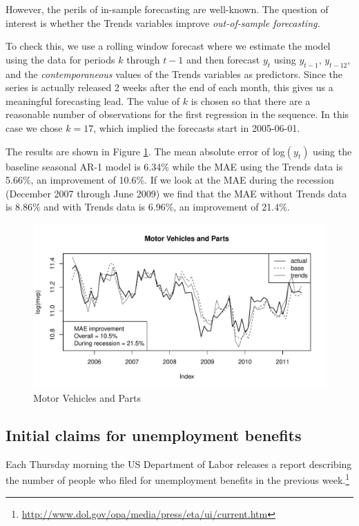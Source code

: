 \documentclass[12pt, oneside]{article}
\begin{document}
However, the perils of in-sample forecasting are well-known.  The
question of interest is whether the Trends variables improve
{\it out-of-sample forecasting.}

To check this, we use a rolling window forecast where we estimate the
model using the data for periods $k$ through $t-1$ and then forecast
$y_t$ using $y_{t-1}$, $y_{t-12}$, and the {\it contemporaneous\/}
values of the Trends variables as predictors.  Since the series is
actually released 2 weeks after the end of each month, this gives us a
meaningful forecasting lead.  The value of $k$ is chosen so that there
are a reasonable number of observations for the first regression in
the sequence.  In this case we chose $k=17$, which implied the
forecasts start in 2005-06-01.

The results are shown in Figure \ref{Fig:autos}.  The mean absolute
error of log$(y_t)$ using the baseline seasonal AR-1 model is 6.34\%
while the MAE using the Trends data is 5.66\%, an improvement of
10.6\%.  If we look at the MAE during the recession (December 2007
through June 2009) we find that the MAE without Trends data is 8.86\%
and with Trends data is 6.96\%, an improvement of 21.4\%.

\begin{figure}[ht]
\begin{center}
\includegraphics[width= 5.5in]{autos}
\caption{\label{Fig:autos} Motor Vehicles and Parts} 
\end{center}
\end{figure}

\subsection{Initial claims for unemployment benefits}
Each Thursday morning the US Department of Labor releases a report
describing the number of people who filed for unemployment benefits in
the previous
week.\footnote{\url{http://www.dol.gov/opa/media/press/eta/ui/current.htm}}
\end{document}
